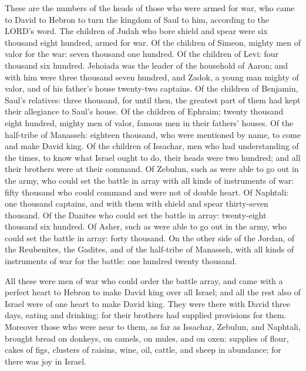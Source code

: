 \myverse{}These are the numbers of the heads of those who were armed for
war, who came to David to Hebron to turn the kingdom of Saul to him, according to the LORD’s word.
\myverse{}The children of Judah who bore shield and spear were six thousand eight hundred,
armed for war.
\myverse{}Of the children of Simeon, mighty men of valor for the war: seven thousand
one hundred.
\myverse{}Of the children of Levi: four thousand six hundred.
\myverse{}Jehoiada was the leader of the household of Aaron; and with him were three
thousand seven hundred,
\myverse{}and Zadok, a young man mighty of valor, and of his father’s house twenty-two
captains.
\myverse{}Of the children of Benjamin, Saul’s relatives: three thousand, for until
then, the greatest part of them had kept their allegiance to Saul’s house.
\myverse{}Of the children of Ephraim: twenty thousand eight hundred, mighty men of
valor, famous men in their fathers’ houses.
\myverse{}Of the half-tribe of Manasseh: eighteen thousand, who were mentioned by name,
to come and make David king.
\myverse{}Of the children of Issachar, men who had understanding of the times, to know
what Israel ought to do, their heads were two hundred; and all their brothers were at their command.
\myverse{}Of Zebulun, such as were able to go out in the army, who could set the battle
in array with all kinds of instruments of war: fifty thousand who could command and were not of double
heart.
\myverse{}Of Naphtali: one thousand captains, and with them with shield and spear thirty-seven
thousand.
\myverse{}Of the Danites who could set the battle in array: twenty-eight thousand six
hundred.
\myverse{}Of Asher, such as were able to go out in the army, who could set the battle
in array: forty thousand.
\myverse{}On the other side of the Jordan, of the Reubenites, the Gadites, and of the
half-tribe of Manasseh, with all kinds of instruments of war for the battle: one hundred twenty thousand.

\myverse{}All these were men of war who could order the battle array,
and came with a perfect heart to Hebron to make David king over all Israel; and all the rest also of Israel
were of one heart to make David king.
\myverse{}They were there with David three days, eating and drinking; for their brothers
had supplied provisions for them.
\myverse{}Moreover those who were near to them, as far as Issachar, Zebulun, and Naphtali,
brought bread on donkeys, on camels, on mules, and on oxen: supplies of flour, cakes of figs, clusters
of raisins, wine, oil, cattle, and sheep in abundance; for there was joy in Israel.


